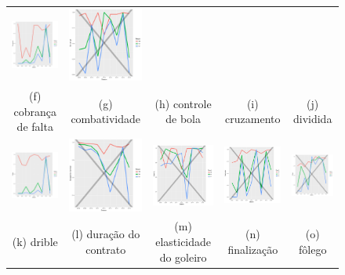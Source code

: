 \documentclass[review]{elsarticle}
\begin{document}
\begin{figure}
\begin{tabular}{ccccc}
  \includegraphics[width=25mm]{cruzamento_result_trans_media} & \includegraphics[width=25mm]{div_empe_result_trans_media} \\
 \scriptsize{(f) cobrança de falta } & \scriptsize{(g) combatividade } & \scriptsize{(h) controle de bola} & \scriptsize{(i) cruzamento} & \scriptsize{(j) dividida}\\[3pt]
 
 \includegraphics[width=25mm]{dribles_result_trans_media} & \includegraphics[width=25mm]{duracaodocontrato_result_trans_media} &   \includegraphics[width=25mm]{elast_gl_result_trans_media} &
  \includegraphics[width=25mm]{finalizacao_result_trans_media} & \includegraphics[width=25mm]{folego_result_trans_media}  \\
 \scriptsize{(k) drible} & \scriptsize{(l) duração do contrato } & \scriptsize{(m) elasticidade do goleiro} & \scriptsize{(n) finalização} & \scriptsize{(o) fôlego}\\[3pt]
 

\end{tabular}
\end{figure}
\end{document}
